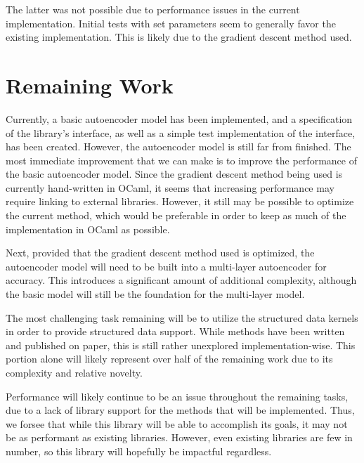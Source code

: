 \documentclass{sig-alternate}
\begin{document}
The latter was not possible due to performance issues in the current implementation. Initial
tests with set parameters seem to generally favor the existing implementation. This is likely
due to the gradient descent method used. 


\section{Remaining Work}
\label{sec:project_proposal}

Currently, a basic autoencoder model has been implemented, and a specification of the library's
interface, as well as a simple test implementation of the interface, has been created. 
However, the autoencoder model is still far from finished. The most immediate improvement
that we can make is to improve the performance of the basic autoencoder model. Since the gradient
descent method being used is currently hand-written in OCaml, it seems that increasing 
performance may require linking to external libraries. However, it still may be possible to
optimize the current method, which would be preferable in order to keep as much of the 
implementation in OCaml as possible.

Next, provided that the gradient descent method used is optimized, the autoencoder model will 
need to be built into a multi-layer autoencoder for accuracy. This introduces a significant
amount of additional complexity, although the basic model will still be the foundation for
the multi-layer model. 

The most challenging task remaining will be to utilize the structured data kernels in order to
provide structured data support. While methods have been written and published on paper,
this is still rather unexplored implementation-wise. This portion alone will likely represent
over half of the remaining work due to its complexity and relative novelty. 

Performance will likely continue to be an issue throughout the remaining tasks, due to a lack
of library support for the methods that will be implemented. Thus, we forsee that while this 
library will be able to accomplish its goals, it may not be as performant as existing 
libraries. However, even existing libraries are few in number, so this library will hopefully
be impactful regardless. 
\end{document}
